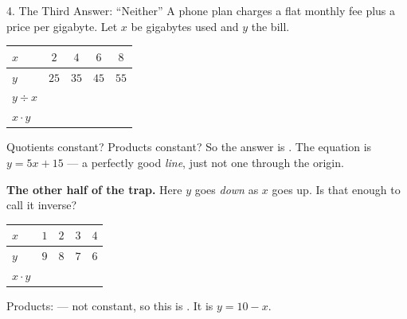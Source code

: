 \documentclass[10pt]{article}
\begin{document}
\begin{notesbox}{4. The Third Answer: ``Neither''}
A phone plan charges a flat monthly fee plus a price per gigabyte. Let $x$ be gigabytes used and $y$
the bill.
\begin{center}
\renewcommand{\arraystretch}{1.3}
\begin{tabular}{|l|c|c|c|c|}
\hline
\rowcolor{forestbg}
$x$ & $2$ & $4$ & $6$ & $8$ \\ \hline
$y$ & $25$ & $35$ & $45$ & $55$ \\ \hline
$y\div x$ & & & & \\ \hline
$x\cdot y$ & & & & \\ \hline
\end{tabular}
\end{center}
\vspace{-2pt}
Quotients constant? \blank{1.0cm} \; Products constant? \blank{1.0cm} \; So the answer is
\blank{2.0cm}. The equation is $y=5x+15$ --- a perfectly good \emph{line}, just not one through the
origin.

\vspace{4pt}
\textbf{The other half of the trap.} Here $y$ goes \emph{down} as $x$ goes up. Is that enough to call
it inverse?
\begin{center}
\renewcommand{\arraystretch}{1.3}
\begin{tabular}{|l|c|c|c|c|}
\hline
\rowcolor{forestbg}
$x$ & $1$ & $2$ & $3$ & $4$ \\ \hline
$y$ & $9$ & $8$ & $7$ & $6$ \\ \hline
$x\cdot y$ & & & & \\ \hline
\end{tabular}
\end{center}
\vspace{-2pt}
Products: \blank{4.0cm} --- not constant, so this is \blank{2.0cm}. It is $y=10-x$.

\vspace{3pt}
\begin{center}
\end{center}
\end{notesbox}
\end{document}
